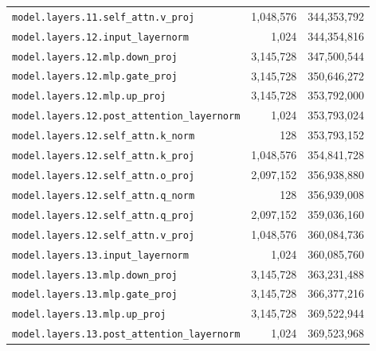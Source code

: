 \documentclass[10pt,a4paper]{article}
\theoremstyle{definition}
\begin{document}
\begin{appendices}
\begin{longtable}{p{9.5cm}rr}
\texttt{model.\allowbreak{}layers.\allowbreak{}11.\allowbreak{}self\_attn.\allowbreak{}v\_proj} & 1,048,576 & 344,353,792 \\
\texttt{model.\allowbreak{}layers.\allowbreak{}12.\allowbreak{}input\_layernorm} & 1,024 & 344,354,816 \\
\texttt{model.\allowbreak{}layers.\allowbreak{}12.\allowbreak{}mlp.\allowbreak{}down\_proj} & 3,145,728 & 347,500,544 \\
\texttt{model.\allowbreak{}layers.\allowbreak{}12.\allowbreak{}mlp.\allowbreak{}gate\_proj} & 3,145,728 & 350,646,272 \\
\texttt{model.\allowbreak{}layers.\allowbreak{}12.\allowbreak{}mlp.\allowbreak{}up\_proj} & 3,145,728 & 353,792,000 \\
\texttt{model.\allowbreak{}layers.\allowbreak{}12.\allowbreak{}post\_attention\_layernorm} & 1,024 & 353,793,024 \\
\texttt{model.\allowbreak{}layers.\allowbreak{}12.\allowbreak{}self\_attn.\allowbreak{}k\_norm} & 128 & 353,793,152 \\
\texttt{model.\allowbreak{}layers.\allowbreak{}12.\allowbreak{}self\_attn.\allowbreak{}k\_proj} & 1,048,576 & 354,841,728 \\
\texttt{model.\allowbreak{}layers.\allowbreak{}12.\allowbreak{}self\_attn.\allowbreak{}o\_proj} & 2,097,152 & 356,938,880 \\
\texttt{model.\allowbreak{}layers.\allowbreak{}12.\allowbreak{}self\_attn.\allowbreak{}q\_norm} & 128 & 356,939,008 \\
\texttt{model.\allowbreak{}layers.\allowbreak{}12.\allowbreak{}self\_attn.\allowbreak{}q\_proj} & 2,097,152 & 359,036,160 \\
\texttt{model.\allowbreak{}layers.\allowbreak{}12.\allowbreak{}self\_attn.\allowbreak{}v\_proj} & 1,048,576 & 360,084,736 \\
\texttt{model.\allowbreak{}layers.\allowbreak{}13.\allowbreak{}input\_layernorm} & 1,024 & 360,085,760 \\
\texttt{model.\allowbreak{}layers.\allowbreak{}13.\allowbreak{}mlp.\allowbreak{}down\_proj} & 3,145,728 & 363,231,488 \\
\texttt{model.\allowbreak{}layers.\allowbreak{}13.\allowbreak{}mlp.\allowbreak{}gate\_proj} & 3,145,728 & 366,377,216 \\
\texttt{model.\allowbreak{}layers.\allowbreak{}13.\allowbreak{}mlp.\allowbreak{}up\_proj} & 3,145,728 & 369,522,944 \\
\texttt{model.\allowbreak{}layers.\allowbreak{}13.\allowbreak{}post\_attention\_layernorm} & 1,024 & 369,523,968 \\

\end{longtable}
\end{appendices}
\end{document}
